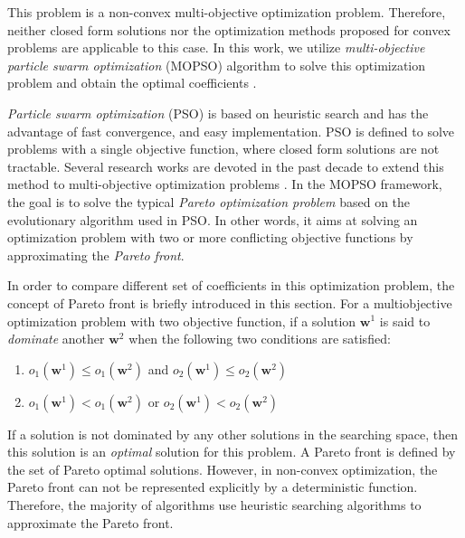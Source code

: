 This problem is a non-convex multi-objective optimization problem. Therefore, neither closed form solutions nor the optimization methods proposed for convex problems are applicable to this case. In this work, we utilize \textit{multi-objective particle swarm optimization} (MOPSO) algorithm to solve this optimization problem and obtain the optimal coefficients \cite{coello2002mopso}.

\textit{Particle swarm optimization} (PSO) is based on heuristic search and has the advantage of fast convergence, and easy implementation\cite{coello2002mopso, alvarez2005mopso}. PSO is defined to solve problems with a single objective function, where closed form solutions are not tractable.  Several research works are devoted in the past decade to extend this method to multi-objective optimization problems \cite{sierra2005improving, coello2005recent}. In the MOPSO framework, the goal is to solve the typical \textit{Pareto optimization problem} based on the evolutionary algorithm used in PSO. In other words, it aims at solving an optimization problem with two or more conflicting objective functions by approximating the \textit{Pareto front}. 


In order to compare different set of coefficients in this optimization problem, the concept of Pareto front is briefly introduced in this section. For a multiobjective optimization problem with two objective function, if a solution $\mathbf{w}^1$ is said to \textit{dominate} another $\mathbf{w}^2$ when the following two conditions are satisfied:
\begin{enumerate}
    \item $o_1(\mathbf{w}^1) \leq  o_1(\mathbf{w}^2)$ and $o_2(\mathbf{w}^1) \leq  o_2(\mathbf{w}^2)$ 
    \item $o_1(\mathbf{w}^1) <  o_1(\mathbf{w}^2)$ or $o_2(\mathbf{w}^1) < o_2(\mathbf{w}^2)$ 
\end{enumerate}

If a solution is not dominated by any other solutions in the searching space, then this solution is an \textit{optimal} solution for this problem. A Pareto front is defined by the set of Pareto optimal solutions. However, in non-convex optimization, the Pareto front can not be represented explicitly by a deterministic function. Therefore, the majority of algorithms use heuristic searching algorithms to approximate the Pareto front\cite{coello2002mopso}.

